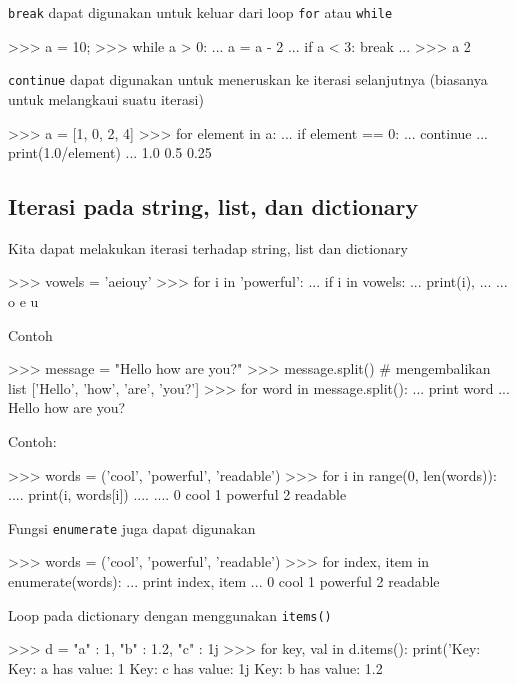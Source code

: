 \texttt{break} dapat digunakan untuk
keluar dari loop \texttt{for} atau \texttt{while}
\begin{pyconcode}
>>> a = 10;
>>> while a > 0:
...     a = a - 2
...     if a < 3: break
... 
>>> a
2
\end{pyconcode}


\texttt{continue} dapat digunakan untuk meneruskan ke
iterasi selanjutnya (biasanya untuk melangkaui suatu iterasi)
\begin{pyconcode}
>>> a = [1, 0, 2, 4]
>>> for element in a:
...     if element == 0:
...         continue
...     print(1.0/element)
...     
1.0
0.5
0.25
\end{pyconcode}


\subsection{Iterasi pada string, list, dan dictionary}

Kita dapat melakukan iterasi terhadap string, list dan dictionary
\begin{pyconcode}
>>> vowels = 'aeiouy'
>>> for i in 'powerful':
...     if i in vowels:
...         print(i),
...         
...         
o e u
\end{pyconcode}

Contoh
\begin{pyconcode}
>>> message = "Hello how are you?"
>>> message.split() # mengembalikan list
['Hello', 'how', 'are', 'you?']
>>> for word in message.split():
...     print word
...     
Hello
how
are
you?
\end{pyconcode}

Contoh:
\begin{pyconcode}
>>> words = ('cool', 'powerful', 'readable')
>>> for i in range(0, len(words)):
....     print(i, words[i])
....     
....     
0 cool
1 powerful
2 readable
\end{pyconcode}

Fungsi \texttt{enumerate} juga dapat digunakan
\begin{pyconcode}
>>> words = ('cool', 'powerful', 'readable')
>>> for index, item in enumerate(words):
...     print index, item
...     
0 cool
1 powerful
2 readable
\end{pyconcode}


Loop pada dictionary dengan menggunakan \texttt{items()}
\begin{pyconcode}
>>> d = {"a" : 1, "b" : 1.2, "c" : 1j}
>>> for key, val in d.items():
        print('Key: %
Key: a has value: 1
Key: c has value: 1j
Key: b has value: 1.2
\end{pyconcode}
